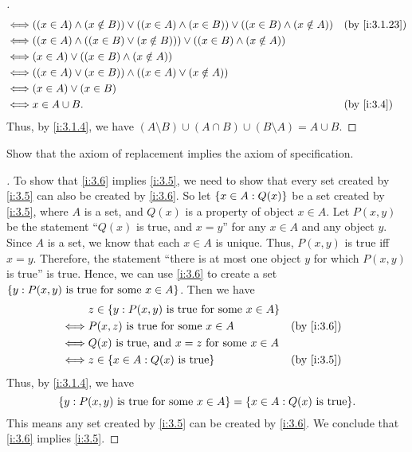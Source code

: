 \begin{proof}[]
\begin{align*}
    \iff & ((x \in A) \land (x \notin B)) \lor ((x \in A) \land (x \in B)) \lor ((x \in B) \land (x \notin A)) &  & \by{i:3.1.23} \\
    \iff & ((x \in A) \land ((x \in B) \lor (x \notin B))) \lor ((x \in B) \land (x \notin A))                                    \\
    \iff & (x \in A) \lor ((x \in B) \land (x \notin A))                                                                          \\
    \iff & ((x \in A) \lor (x \in B)) \land ((x \in A) \lor (x \notin A))                                                         \\
    \iff & (x \in A) \lor (x \in B)                                                                                               \\
    \iff & x \in A \cup B.                                                                                     &  & \by{i:3.4}
  \end{align*}
  Thus, by \cref{i:3.1.4}, we have \((A \setminus B) \cup (A \cap B) \cup (B \setminus A) = A \cup B\).
\end{proof}

\begin{ex}\label{i:ex:3.1.11}
  Show that the axiom of replacement implies the axiom of specification.
\end{ex}

\begin{proof}[]
  To show that \cref{i:3.6} implies \cref{i:3.5}, we need to show that every set created by \cref{i:3.5} can also be created by \cref{i:3.6}.
  So let \(\left\lbrace x \in A : Q(x)\right\rbrace\) be a set created by \cref{i:3.5}, where \(A\) is a set, and \(Q(x)\) is a property of object \(x \in A\).
  Let \(P(x, y)\) be the statement ``\(Q(x)\) is true, and \(x = y\)'' for any \(x \in A\) and any object \(y\).
  Since \(A\) is a set, we know that each \(x \in A\) is unique.
  Thus, \(P(x, y)\) is true iff \(x = y\).
  Therefore, the statement ``there is at most one object \(y\) for which \(P(x, y)\) is true'' is true.
  Hence, we can use \cref{i:3.6} to create a set \(\left\lbrace y : P(x, y) \text{ is true for some } x \in A\right\rbrace\).
  Then we have
  \begin{align*}
         & z \in \set{y : P(x, y) \text{ is true for some } x \in A}                  \\
    \iff & P(x, z) \text{ is true for some } x \in A                  &  & \by{i:3.6} \\
    \iff & Q(x) \text{ is true, and } x = z \text{ for some } x \in A                 \\
    \iff & z \in \set{x \in A : Q(x) \text{ is true}}                 &  & \by{i:3.5}
  \end{align*}
  Thus, by \cref{i:3.1.4}, we have
  \[
    \set{y : P(x, y) \text{ is true for some } x \in A} = \set{x \in A : Q(x) \text{ is true}}.
  \]
  This means any set created by \cref{i:3.5} can be created by \cref{i:3.6}.
  We conclude that \cref{i:3.6} implies \cref{i:3.5}.
\end{proof}
